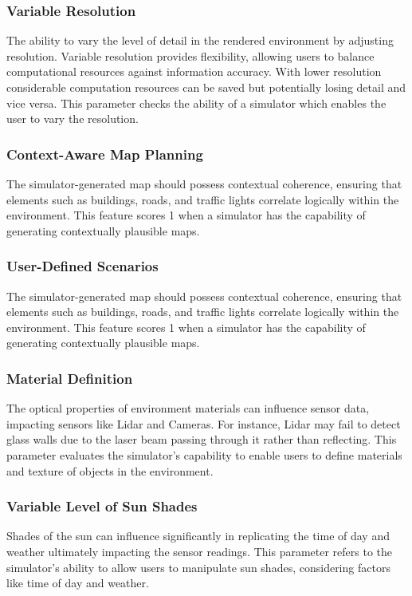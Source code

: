 \documentclass[12pt,twoside,a4paper,parskip]{scrbook} %
\begin{document}
\subsubsection{Variable Resolution}
The ability to vary the level of detail in the rendered environment by adjusting resolution. Variable resolution provides flexibility, allowing users to balance computational resources against information accuracy. With lower resolution considerable computation resources can be saved but potentially losing detail and vice versa. This parameter checks the ability of a simulator which enables the user to vary the resolution.
\subsubsection{Context-Aware Map Planning}
The simulator-generated map should possess contextual coherence, ensuring that elements such as buildings, roads, and traffic lights correlate logically within the environment. This feature scores 1 when a simulator has the capability of generating contextually plausible maps.
\subsubsection{User-Defined Scenarios}
The simulator-generated map should possess contextual coherence, ensuring that elements such as buildings, roads, and traffic lights correlate logically within the environment. This feature scores 1 when a simulator has the capability of generating contextually plausible maps.
\subsubsection{Material Definition}
The optical properties of environment materials can influence sensor data, impacting sensors like Lidar and Cameras. For instance, Lidar may fail to detect glass walls due to the laser beam passing through it rather than reflecting. This parameter evaluates the simulator's capability to enable users to define materials and texture of objects in the environment.
\subsubsection{Variable Level of Sun Shades}
Shades of the sun can influence significantly in replicating the time of day and weather ultimately impacting the sensor readings. This parameter refers to the simulator's ability to allow users to manipulate sun shades, considering factors like time of day and weather.
\end{document}
